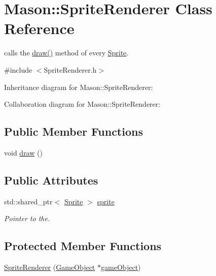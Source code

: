 \hypertarget{class_mason_1_1_sprite_renderer}{}\section{Mason\+:\+:Sprite\+Renderer Class Reference}
\label{class_mason_1_1_sprite_renderer}


calls the \hyperlink{class_mason_1_1_sprite_renderer_aeeeaa7eb5c340b7c2abad3d4785fd1e1}{draw()} method of every \hyperlink{class_mason_1_1_sprite}{Sprite}.  




{\ttfamily \#include $<$Sprite\+Renderer.\+h$>$}



Inheritance diagram for Mason\+:\+:Sprite\+Renderer\+:


Collaboration diagram for Mason\+:\+:Sprite\+Renderer\+:
\subsection*{Public Member Functions}
\begin{DoxyCompactItemize}
\item 
void \hyperlink{class_mason_1_1_sprite_renderer_aeeeaa7eb5c340b7c2abad3d4785fd1e1}{draw} ()
\end{DoxyCompactItemize}
\subsection*{Public Attributes}
\begin{DoxyCompactItemize}
\item 
std\+::shared\+\_\+ptr$<$ \hyperlink{class_mason_1_1_sprite}{Sprite} $>$ \hyperlink{class_mason_1_1_sprite_renderer_a17a9d82d45d7ae1058542e5c939122c6}{sprite}
\begin{DoxyCompactList}\small\item\em Pointer to the. \end{DoxyCompactList}\end{DoxyCompactItemize}
\subsection*{Protected Member Functions}
\begin{DoxyCompactItemize}
\item 
\hyperlink{class_mason_1_1_sprite_renderer_a82f81ad1b56677f6194d91956b213add}{Sprite\+Renderer} (\hyperlink{class_mason_1_1_game_object}{Game\+Object} $\ast$\hyperlink{class_mason_1_1_component_a30030370c35f5562cbbbb0927b0448c8}{game\+Object})
\end{DoxyCompactItemize}
